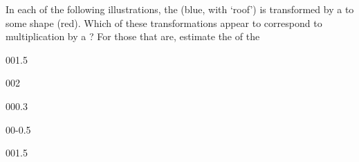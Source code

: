 \begin{exercise}  
In each of the following illustrations, the  (blue, with `roof') is transformed by a  to some shape (red).
Which of these transformations appear to correspond to multiplication by a ?  
For those that are, estimate the  of the 
\begin{Parts}
\item {}

\begin{reduce}
\item {}00{1.5}

\item {}00{2}
\end{reduce}

\item {}00{0.3}

\item {}

\begin{reduce}
\item {}

\item {}00{-0.5}
\end{reduce}

\item {}

\item {}00{1.5}

\item {}

\end{Parts}
\end{exercise}




